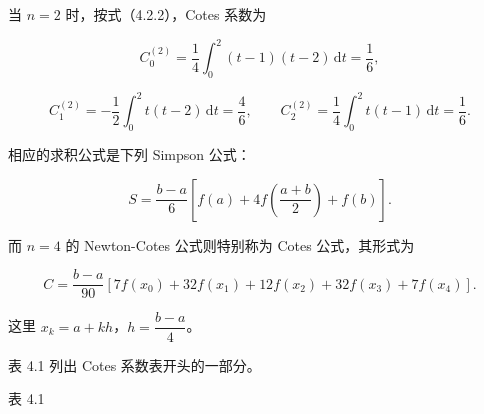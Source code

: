 \documentclass[
  10pt,
  fontset=fandol]{ctexart}
\begin{document}
当 \(n=2\) 时，按式（4.2.2），Cotes 系数为

\[
C_0^{(2)}=\frac14\int_0^2(t-1)(t-2)\,\mathrm{d}t=\frac16,
\]

\[
C_1^{(2)}=-\frac12\int_0^2t(t-2)\,\mathrm{d}t=\frac46,\qquad
C_2^{(2)}=\frac14\int_0^2t(t-1)\,\mathrm{d}t=\frac16.
\]

相应的求积公式是下列 Simpson 公式：

\[
S=\frac{b-a}{6}\left[f(a)+4f\left(\frac{a+b}{2}\right)+f(b)\right].
\tag{4.2.3}
\]

而 \(n=4\) 的 Newton-Cotes 公式则特别称为 Cotes 公式，其形式为

\[
C=\frac{b-a}{90}[7f(x_0)+32f(x_1)+12f(x_2)+32f(x_3)+7f(x_4)].
\tag{4.2.4}
\]

这里 \(x_k=a+kh\)，\(h=\dfrac{b-a}{4}\)。

表 4.1 列出 Cotes 系数表开头的一部分。

表 4.1
\end{document}
